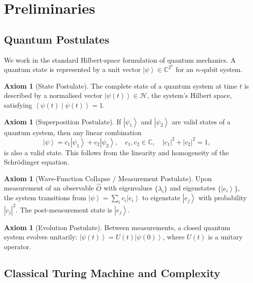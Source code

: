 \documentclass[12pt, a4paper]{article}
\theoremstyle{plain}
\theoremstyle{definition}
\newtheorem{axiom}[theorem]{Axiom}
\theoremstyle{remark}
\newcommand{\ket}[1]{\left| #1 \right\rangle}
\newcommand{\braket}[2]{\left\langle #1 \mid #2 \right\rangle}
\newcommand{\Complex}{\mathbb{C}}
\begin{document}
\section{Preliminaries}
\label{sec:prelim}

\subsection{Quantum Postulates}

We work in the standard Hilbert-space formulation of quantum mechanics.  A
quantum state is represented by a unit vector $\ket{\psi} \in \Complex^{2^n}$
for an $n$-qubit system.

\begin{axiom}[State Postulate]
  The complete state of a quantum system at time $t$ is described by a
  normalised vector $\ket{\psi(t)} \in \mathcal{H}$, the system's Hilbert
  space, satisfying $\braket{\psi(t)}{\psi(t)} = 1$.
\end{axiom}

\begin{axiom}[Superposition Postulate]
  If $\ket{\psi_1}$ and $\ket{\psi_2}$ are valid states of a quantum system,
  then any linear combination
  \[
    \ket{\psi} = c_1 \ket{\psi_1} + c_2 \ket{\psi_2},
    \quad c_1, c_2 \in \Complex, \quad |c_1|^2 + |c_2|^2 = 1,
  \]
  is also a valid state.  This follows from the linearity and homogeneity of
  the Schr\"{o}dinger equation.
\end{axiom}

\begin{axiom}[Wave-Function Collapse / Measurement Postulate]
  Upon measurement of an observable $\hat{O}$ with eigenvalues
  $\{\lambda_i\}$ and eigenstates $\{\ket{e_i}\}$, the system transitions
  from $\ket{\psi} = \sum_i c_i \ket{e_i}$ to eigenstate $\ket{e_j}$ with
  probability $|c_j|^2$.  The post-measurement state is $\ket{e_j}$.
\end{axiom}

\begin{axiom}[Evolution Postulate]
  Between measurements, a closed quantum system evolves unitarily:
  $\ket{\psi(t)} = U(t)\ket{\psi(0)}$, where $U(t)$ is a unitary operator.
\end{axiom}

\subsection{Classical Turing Machine and Complexity}
\end{document}

